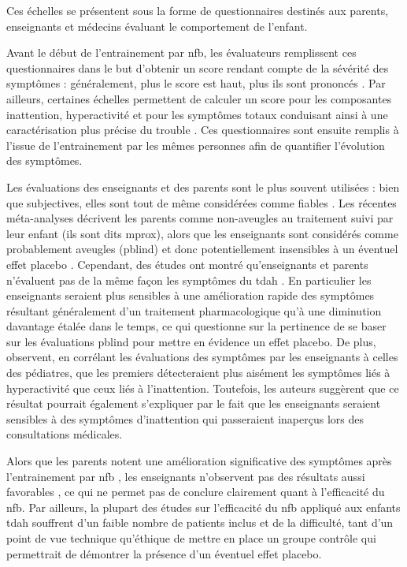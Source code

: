 Ces échelles se présentent sous la forme de questionnaires destinés aux parents, enseignants et médecins évaluant le comportement de l'enfant. 

Avant le début de l'entrainement par \gls{nfb}, les évaluateurs remplissent ces questionnaires dans le but d'obtenir un score rendant compte de 
la sévérité des symptômes : généralement, plus le score est haut, plus ils sont prononcés \citep{Pappas2006, Conners2008}. Par ailleurs, certaines échelles 
permettent de calculer un score pour les composantes inattention, hyperactivité et pour les symptômes totaux conduisant ainsi à une caractérisation 
plus précise du trouble \citep{Pappas2006}. Ces questionnaires sont ensuite remplis à l'issue de l'entrainement par les mêmes personnes afin de quantifier l'évolution 
des symptômes. 

Les évaluations des enseignants et des parents sont le plus souvent utilisées : bien que subjectives, elles sont tout de même considérées comme fiables 
\citep{Mcgough2004, Arns2020}. Les récentes méta-analyses décrivent les parents comme non-aveugles au traitement suivi par leur enfant (ils sont dits \gls{mprox}), alors
que les enseignants sont considérés comme probablement aveugles (\gls{pblind}) et donc potentiellement insensibles à un éventuel effet placebo 
\citep{Micoulaud2014, Cortese2016}. Cependant, des études ont montré qu'enseignants et parents n'évaluent pas de la même façon les symptômes du \gls{tdah}
\citep{Sollie2013, Narad2015, Minder2018, Enriquez2019, Arns2020}. En particulier les enseignants seraient plus sensibles à une amélioration
rapide des symptômes résultant généralement d'un traitement pharmacologique qu'à une diminution davantage étalée dans le temps, 
ce qui questionne sur la pertinence de se baser sur les évaluations \gls{pblind} pour mettre en évidence un 
effet placebo. De plus, \citet{Staff2020} observent, en corrélant les évaluations des symptômes par les enseignants à celles des pédiatres, que les premiers 
détecteraient plus aisément les symptômes liés à hyperactivité que ceux liés à l'inattention. Toutefois, les auteurs suggèrent que ce résultat 
pourrait également s'expliquer par le fait que les enseignants seraient sensibles à des symptômes d'inattention qui passeraient inaperçus lors 
des consultations médicales. 

Alors que les parents notent une amélioration significative des symptômes après l'entrainement par \gls{nfb} \citep{Arns2020}, les enseignants n'observent pas des
résultats aussi favorables \citep{Sonuga-Barke2013, Cortese2016}, ce qui ne permet pas de conclure clairement quant à l'efficacité du \gls{nfb}.
Par ailleurs, la plupart des études sur l'efficacité du \gls{nfb} appliqué aux enfants \gls{tdah} souffrent d'un faible nombre de patients inclus 
\citep{Baumeister2016, Heinrich2004} et de la difficulté, tant d'un point de vue technique qu'éthique \citep{LaVaque2001, Birbaumer1991, Holtmann2014} de mettre en place 
un groupe contrôle qui permettrait de démontrer la présence d'un éventuel effet placebo.

